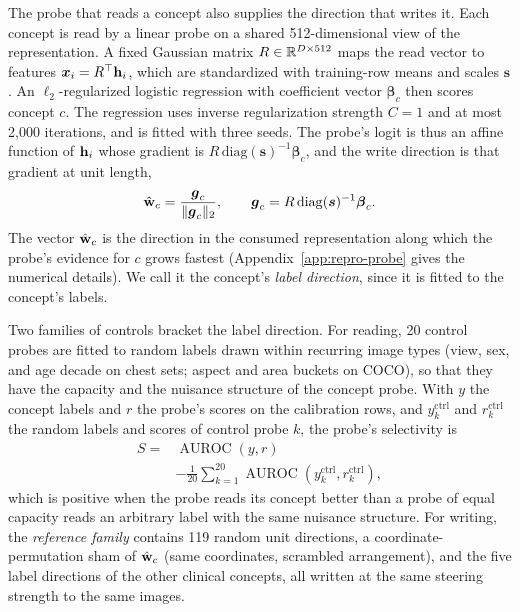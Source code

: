 The probe that reads a concept also supplies the direction that writes it. Each concept is read by a linear probe on a shared 512-dimensional view of the representation. A fixed Gaussian matrix $R\in\mathbb{R}^{D\times512}$ maps the read vector to features $\boldsymbol x_i=R^{\top}\mathbf{h}_i$, which are standardized with training-row means and scales $\boldsymbol s$. An $\ell_2$-regularized logistic regression with coefficient vector $\boldsymbol\beta_c$ then scores concept $c$. The regression uses inverse regularization strength $C=1$ and at most 2{,}000 iterations, and is fitted with three seeds. The probe's logit is thus an affine function of $\mathbf{h}_i$ whose gradient is $R\,\mathrm{diag}(\boldsymbol s)^{-1}\boldsymbol\beta_c$, and the write direction is that gradient at unit length,
\begin{equation}
\hat{\mathbf{w}}_c=\frac{\boldsymbol g_c}{\lVert\boldsymbol g_c\rVert_2},\qquad \boldsymbol g_c=R\,\mathrm{diag}(\boldsymbol s)^{-1}\boldsymbol\beta_c .
\label{eq:lift}
\end{equation}
The vector $\hat{\mathbf{w}}_c$ is the direction in the consumed representation along which the probe's evidence for $c$ grows fastest (Appendix~\ref{app:repro-probe} gives the numerical details). We call it the concept's \emph{label direction}, since it is fitted to the concept's labels.

Two families of controls bracket the label direction. For reading, 20 control probes are fitted to random labels drawn within recurring image types (view, sex, and age decade on chest sets; aspect and area buckets on COCO), so that they have the capacity and the nuisance structure of the concept probe. With $y$ the concept labels and $r$ the probe's scores on the calibration rows, and $y^{\mathrm{ctrl}}_k$ and $r^{\mathrm{ctrl}}_k$ the random labels and scores of control probe $k$, the probe's selectivity is
\begin{equation}
\begin{aligned}
S={}&\operatorname{AUROC}(y,r)\\
&-\tfrac{1}{20}\textstyle\sum_{k=1}^{20}\operatorname{AUROC}(y^{\mathrm{ctrl}}_k,r^{\mathrm{ctrl}}_k),
\end{aligned}
\label{eq:selectivity}
\end{equation}
which is positive when the probe reads its concept better than a probe of equal capacity reads an arbitrary label with the same nuisance structure. For writing, the \emph{reference family} contains 119 random unit directions, a coordinate-permutation sham of $\hat{\mathbf{w}}_c$ (same coordinates, scrambled arrangement), and the five label directions of the other clinical concepts, all written at the same steering strength to the same images.

